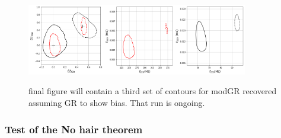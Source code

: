\documentclass[twocolumn,prd,superscriptaddress,amsfonts,amssymb,amsmath,preprintnumbers]{revtex4-1}
\newcommand{\abhi}[1]{\textcolor{red}{[\textit{AG: #1}]}}
\begin{document}
\begin{figure}
	\includegraphics[width=0.3\textwidth]{figures/GW150914_GW190521_simulated_frac.png}\includegraphics[width=0.56\textwidth]{figures/GW150914_GW190521_simulated_abs.png}\label{fig:gr_simulation}
	\caption{final figure will contain a third set of contours for modGR recovered assuming GR to show bias. That run is ongoing.}
\end{figure}

\subsubsection{Test of the No hair theorem}
\end{document}
